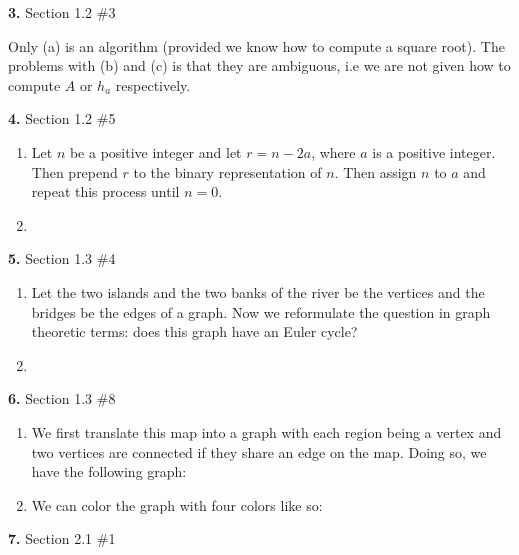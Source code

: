 \documentclass[letterpaper, 11pt]{article}
\newcommand{\hwnumber}[3]{\medskip \noindent\textbf{#1.} Section #2 \##3 \smallskip}
\begin{document}
\newpage

\hwnumber{3}{1.2}{3}

Only (a) is an algorithm (provided we know how to compute a square root). The
problems with (b) and (c) is that they are ambiguous, i.e we are not given how
to compute $A$ or $h_a$ respectively. 

\hwnumber{4}{1.2}{5}

\begin{enumerate}[label = (\alph*)]
  \item Let $n$ be a positive integer and let $r = n - 2a$, where $a$ is 
    a positive integer. Then prepend $r$ to the binary representation of 
    $n$. Then assign $n$ to $a$ and repeat this process until $n = 0$. 

  \item 

\end{enumerate}


\hwnumber{5}{1.3}{4}

\begin{enumerate}[label = (\alph*)]
  \item Let the two islands and the two banks of the river be the vertices and the
    bridges be the edges of a graph. Now we reformulate the question in graph
    theoretic terms: does this graph have an Euler cycle?

   \item 
\end{enumerate}



\hwnumber{6}{1.3}{8}

\begin{enumerate}[label = (\alph*)]
  \item We first translate this map into a graph with each region being a vertex
    and two vertices are connected if they share an edge on the map. Doing so,
    we have the following graph:

  \item We can color the graph with four colors like so:

\end{enumerate}


\hwnumber{7}{2.1}{1}
\end{document}
